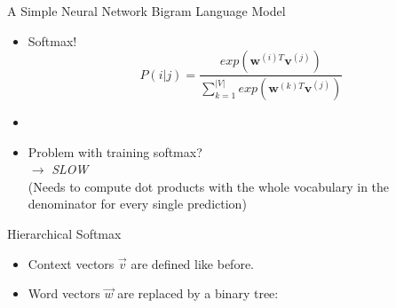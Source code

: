 
\begin{vbframe}{A Simple Neural Network Bigram Language Model}

\vfill

\begin{itemize}
	\item Softmax!
	$$P(i|j) = \frac{exp(\mathbf{w}^{(i)T} \mathbf{v}^{(j)})}{\sum_{k=1}^{|V|} exp(\mathbf{w}^{(k)T} \mathbf{v}^{(j)})}$$
	\item[]
	\item \ques Problem with training softmax?
	\\ $\rightarrow$ \textit{SLOW}
	\\ (Needs to compute dot products with the whole vocabulary in the denominator for every single prediction)
\end{itemize}

\vfill

\end{vbframe}


\begin{vbframe}{Hierarchical Softmax}

\vfill

\begin{itemize}
	\item Context vectors $\vec v$ are defined like before.
	\item Word vectors $\vec w$ are replaced by a binary tree:
\end{itemize}

\begin{center}
\end{center}

\vfill

\end{vbframe}

